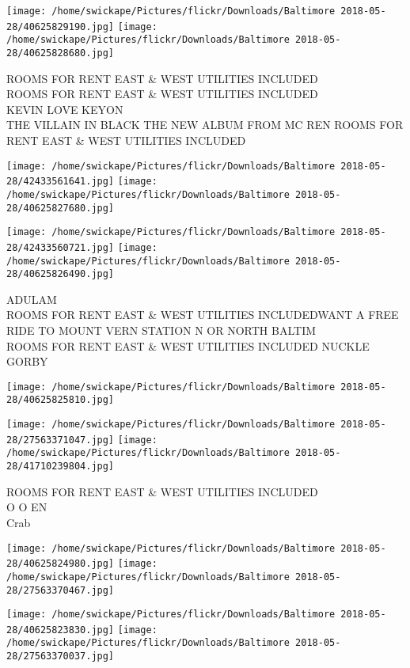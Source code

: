 \documentclass[10pt,letterpaper]{article}
\begin{document}
\texttt{[image: /home/swickape/Pictures/flickr/Downloads/Baltimore 2018-05-28/40625829190.jpg]}
\texttt{[image: /home/swickape/Pictures/flickr/Downloads/Baltimore 2018-05-28/40625828680.jpg]}

ROOMS FOR RENT EAST \& WEST UTILITIES INCLUDED\\
ROOMS FOR RENT EAST \& WEST UTILITIES INCLUDED\\
KEVIN LOVE KEYON\\
THE VILLAIN IN BLACK THE NEW ALBUM FROM MC REN ROOMS FOR RENT EAST \& WEST UTILITIES INCLUDED
\pagebreak

\texttt{[image: /home/swickape/Pictures/flickr/Downloads/Baltimore 2018-05-28/42433561641.jpg]}
\texttt{[image: /home/swickape/Pictures/flickr/Downloads/Baltimore 2018-05-28/40625827680.jpg]}

\texttt{[image: /home/swickape/Pictures/flickr/Downloads/Baltimore 2018-05-28/42433560721.jpg]}
\texttt{[image: /home/swickape/Pictures/flickr/Downloads/Baltimore 2018-05-28/40625826490.jpg]}

ADULAM\\
ROOMS FOR RENT EAST \& WEST UTILITIES INCLUDEDWANT A FREE RIDE TO MOUNT VERN STATION N OR NORTH BALTIM\\
ROOMS FOR RENT EAST \& WEST UTILITIES INCLUDED NUCKLE\\
GORBY
\pagebreak

\texttt{[image: /home/swickape/Pictures/flickr/Downloads/Baltimore 2018-05-28/40625825810.jpg]}

\vspace{0.25in}
\texttt{[image: /home/swickape/Pictures/flickr/Downloads/Baltimore 2018-05-28/27563371047.jpg]}
\texttt{[image: /home/swickape/Pictures/flickr/Downloads/Baltimore 2018-05-28/41710239804.jpg]}

ROOMS FOR RENT EAST \& WEST UTILITIES INCLUDED\\
O O EN\\
Crab
\pagebreak

\texttt{[image: /home/swickape/Pictures/flickr/Downloads/Baltimore 2018-05-28/40625824980.jpg]}
\texttt{[image: /home/swickape/Pictures/flickr/Downloads/Baltimore 2018-05-28/27563370467.jpg]}

\texttt{[image: /home/swickape/Pictures/flickr/Downloads/Baltimore 2018-05-28/40625823830.jpg]}
\texttt{[image: /home/swickape/Pictures/flickr/Downloads/Baltimore 2018-05-28/27563370037.jpg]}
\end{document}
